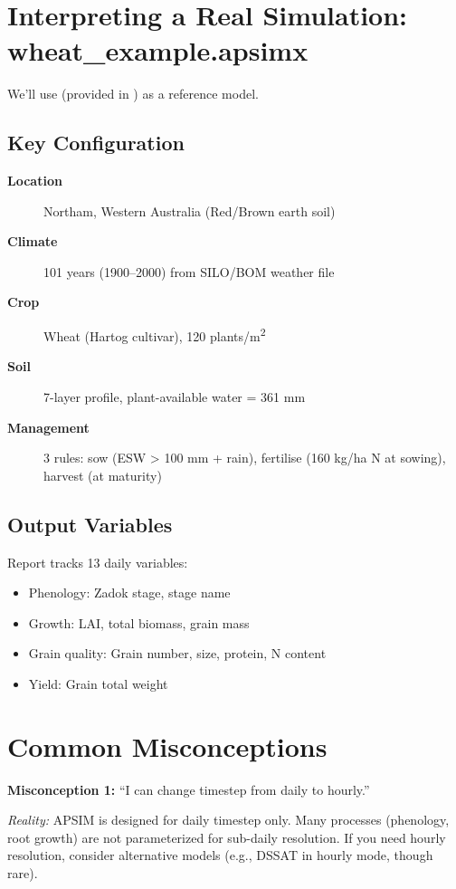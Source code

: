 \section{Interpreting a Real Simulation: wheat\_example.apsimx}

We'll use  (provided in ) as a reference model.

\subsection{Key Configuration}

\begin{description}
  \item[\textbf{Location}] Northam, Western Australia (Red/Brown earth soil)
  \item[\textbf{Climate}] 101 years (1900--2000) from SILO/BOM weather file
  \item[\textbf{Crop}] Wheat (Hartog cultivar), 120 plants/m\textsuperscript{2}
  \item[\textbf{Soil}] 7-layer profile, plant-available water = 361 mm
  \item[\textbf{Management}] 3 rules: sow (ESW > 100 mm + rain), fertilise (160 kg/ha N at sowing), harvest (at maturity)
\end{description}

\subsection{Output Variables}

Report tracks 13 daily variables:
\begin{itemize}
  \item Phenology: Zadok stage, stage name
  \item Growth: LAI, total biomass, grain mass
  \item Grain quality: Grain number, size, protein, N content
  \item Yield: Grain total weight
\end{itemize}

\section{Common Misconceptions}

\begin{warningbox}
\textbf{Misconception 1:} ``I can change timestep from daily to hourly.''

\textit{Reality:} APSIM is designed for daily timestep only. Many processes (phenology, root growth) are not parameterized for sub-daily resolution. If you need hourly resolution, consider alternative models (e.g., DSSAT in hourly mode, though rare).
\end{warningbox}

